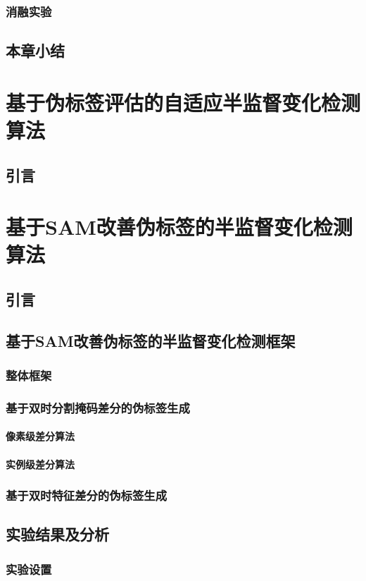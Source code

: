 \documentclass[lang=chs, degree=master, blindreview=false, adobe=false]{yanputhesis}
\begin{document}
\subsection{消融实验}
\section{本章小结}
\chapter{基于伪标签评估的自适应半监督变化检测算法}
\section{引言}


\chapter{基于SAM改善伪标签的半监督变化检测算法}
\section{引言}
\section{基于SAM改善伪标签的半监督变化检测框架}
\subsection{整体框架}
\subsection{基于双时分割掩码差分的伪标签生成}
\subsubsection{像素级差分算法}
\subsubsection{实例级差分算法}
\subsection{基于双时特征差分的伪标签生成}
\section{实验结果及分析}
\subsection{实验设置}
\end{document}
